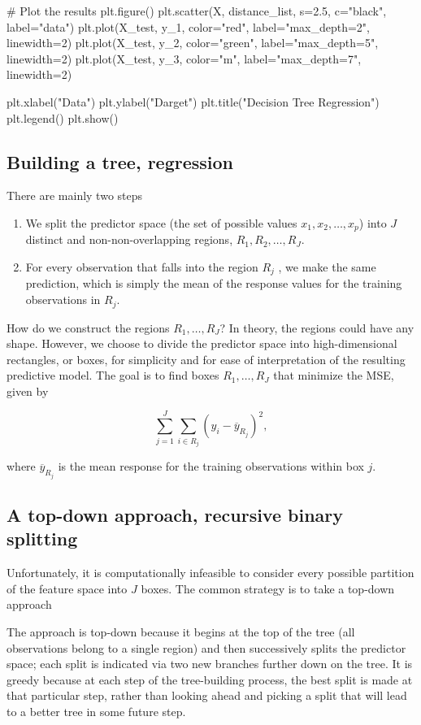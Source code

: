 \documentclass[%
oneside,                 %
final,                   %
10pt]{article}
\begin{document}
# Plot the results
plt.figure()
plt.scatter(X, distance_list, s=2.5, c="black", label="data")
plt.plot(X_test, y_1, color="red",
         label="max_depth=2", linewidth=2)
plt.plot(X_test, y_2, color="green", label="max_depth=5", linewidth=2)
plt.plot(X_test, y_3, color="m", label="max_depth=7", linewidth=2)

plt.xlabel("Data")
plt.ylabel("Darget")
plt.title("Decision Tree Regression")
plt.legend()
plt.show()

\epycod



\subsection{Building a tree, regression}

There are mainly two steps
\begin{enumerate}
\item We split the predictor space (the set of possible values $x_1,x_2,\dots, x_p$) into $J$ distinct and non-non-overlapping regions, $R_1,R_2,\dots,R_J$.  

\item For every observation that falls into the region $R_j$ , we make the same prediction, which is simply the mean of the response values for the training observations in $R_j$.
\end{enumerate}

\noindent
How do we construct the regions $R_1,\dots,R_J$?  In theory, the
regions could have any shape. However, we choose to divide the
predictor space into high-dimensional rectangles, or boxes, for
simplicity and for ease of interpretation of the resulting predictive
model. The goal is to find boxes $R_1,\dots,R_J$ that minimize the
MSE, given by

\[
\sum_{j=1}^J\sum_{i\in R_j}(y_i-\overline{y}_{R_j})^2,
\]

where $\overline{y}_{R_j}$  is the mean response for the training observations 
within box $j$. 

\subsection{A top-down approach, recursive binary splitting}

Unfortunately, it is computationally infeasible to consider every
possible partition of the feature space into $J$ boxes.  The common
strategy is to take a top-down approach

The approach is top-down because it begins at the top of the tree (all
observations belong to a single region) and then successively splits
the predictor space; each split is indicated via two new branches
further down on the tree. It is greedy because at each step of the
tree-building process, the best split is made at that particular step,
rather than looking ahead and picking a split that will lead to a
better tree in some future step.
\end{document}
